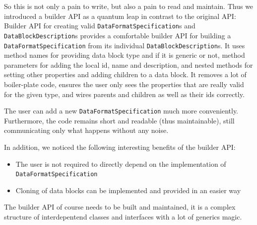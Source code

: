 So this is not only a pain to write, but also a pain to read and maintain. Thus we introduced a builder API as a quantum leap in contrast to the original API:
{%
Builder API for creating valid \texttt{DataFormatSpecification}s and \texttt{DataBlockDescription}s
}
{%
\COMPdataFormatManagement{} provides a comfortable builder API for building a \texttt{DataFormatSpecification} from its individual \texttt{DataBlockDescription}s. It uses method names for providing data block type and if it is generic or not, method parameters for adding the local id, name and description, and nested methods for setting other properties and adding children to a data block. It removes a lot of boiler-plate code, ensures the user only sees the properties that are really valid for the given type, and wires parents and children as well as their ids correctly.
}
{%
The user can add a new \texttt{DataFormatSpecification} much more conveniently. Furthermore, the code remains short and readable (thus maintainable), still communicating only what happens without any noise.

In addition, we noticed the following interesting benefits of the builder API:
\begin{itemize}
\item The user is not required to directly depend on the implementation of \texttt{DataFormatSpecification}
\item Cloning of data blocks can be implemented and provided in an easier way
\end{itemize}
}
{%
The builder API of course needs to be built and maintained, it is a complex structure of interdepentend classes and interfaces with a lot of generics magic. 
}


%
%

